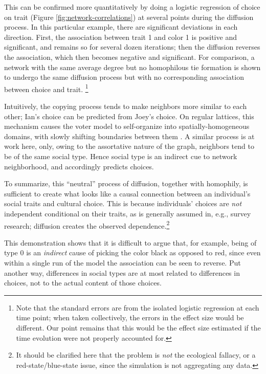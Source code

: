 \documentclass{article}
\begin{document}
\begin{multicols}{2}
This can be confirmed more quantitatively by doing a logistic regression of
choice on trait (Figure \ref{fig:network-correlations}) at several points
during the diffusion process. In this particular example, there are significant
deviations in each direction. First, the association between trait 1 and color
1 is positive and significant, and remains so for several dozen iterations;
then the diffusion reverses the association, which then becomes negative and
significant. For comparison, a network with the same average degree but no
homophilous tie formation is shown to undergo the same diffusion process but
with no corresponding association between choice and trait. \footnote{Note that
  the standard errors are from the isolated logistic regression at each time
  point; when taken collectively, the errors in the effect size would be
  different. Our point remains that this would be the effect size estimated if
  the time evolution were not properly accounted for.}

Intuitively, the copying process tends to make neighbors more similar to each
other; Ian's choice can be predicted from Joey's choice.  On regular lattices,
this mechanism causes the voter model to self-organize into
spatially-homogeneous domains, with slowly shifting boundaries between them
\citep{Cox-Griffeath-voter-model}.  A similar process is at work here, only,
owing to the assortative nature of the graph, neighbors tend to be of the same
social type.  Hence social type is an indirect cue to network neighborhood, and
accordingly predicts choices.

To summarize, this ``neutral'' process of diffusion, together with homophily,
is sufficient to create what looks like a causal connection between an
individual's social traits and cultural choice.  This is because individuals'
choices are {\em not} independent conditional on their traits, as is generally
assumed in, e.g., survey research; diffusion creates the observed
dependence.\footnote{It should be clarified here that the problem is {\em not}
  the ecological fallacy, or a red-state/blue-state issue,
  \citep{Gelman-et-al-red-state-blue-state} since the simulation is not
  aggregating any data.}

This demonstration shows that it is difficult to argue that, for example, being
of type 0 is an {\em indirect} cause of picking the color black as opposed to
red, since even within a single run of the model the association can be seen to
reverse. Put another way, differences in social types are at most related to
differences in choices, not to the actual content of those choices.



\end{multicols}
\end{document}
